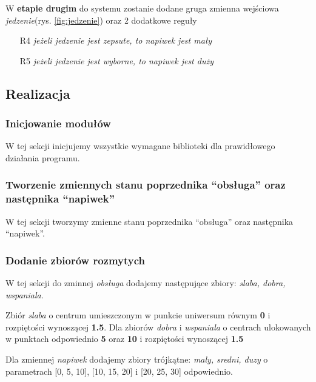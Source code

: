 \documentclass[a4paper, 10pt]{article}
\begin{document}
W \textbf{etapie drugim} do systemu zostanie dodane gruga zmienna wejściowa \emph{jedzenie}(rys. \ref{fig:jedzenie}) oraz 2 dodatkowe reguły
\begin{itemize}
	\item[R4] \emph{jeżeli jedzenie jest zepsute, to napiwek jest mały}
	\item[R5] \emph{jeżeli jedzenie jest wyborne, to napiwek jest duży}
\end{itemize}


\subsection{Realizacja}
\subsubsection{Inicjowanie modułów}\label{p1}

W tej sekcji inicjujemy wszystkie wymagane biblioteki dla prawidłowego działania programu.



\subsubsection{Tworzenie zmiennych stanu poprzednika ``obsługa'' oraz następnika ``napiwek''}\label{p2}

W tej sekcji tworzymy zmienne stanu poprzednika ``obsługa'' oraz następnika ``napiwek''.



\subsubsection{Dodanie zbiorów rozmytych}\label{p3}
 
W tej sekcji do zminnej \emph{obsługa} dodajemy następujące zbiory: \emph{slaba, dobra, wspaniala}. 

Zbiór \emph{slaba} o centrum umieszczonym w punkcie uniwersum równym \textbf{0} i rozpiętości wynoszącej \textbf{1.5}. Dla zbiorów \emph{dobra} i \emph{wspaniala} o centrach ulokowanych w punktach odpowiednio \textbf{5} oraz \textbf{10} i rozpiętości wynoszącej \textbf{1.5}

Dla zmiennej \emph{napiwek} dodajemy zbiory trójkątne: \emph{maly, sredni, duzy} o parametrach [0, 5, 10], [10, 15, 20] i [20, 25, 30] odpowiednio.
\end{document}
